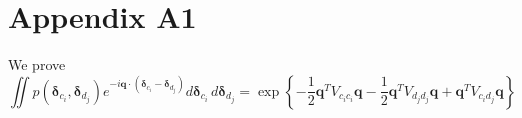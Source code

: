 \documentclass{article}
\begin{document}
\section{Appendix A1}
We prove
\begin{equation}
\iint p( \boldsymbol{\delta}_{c_i},  \boldsymbol{\delta}_{d_j} )
e^{-i \mathbf{q} \cdot ( \boldsymbol{\delta}_{c_i}  - \boldsymbol{\delta}_{d_j})} 
d \boldsymbol{\delta}_{c_i}  \, d \boldsymbol{\delta}_{d_j}
=
\exp \left\{
- \frac{1}{2} \mathbf{q}^T V_{c_i c_i} \mathbf{q}
- \frac{1}{2} \mathbf{q}^T V_{d_j d_j} \mathbf{q}
+ \mathbf{q}^T V_{c_i d_j} \mathbf{q}
\right\}
\label{eq:disorder_term}
\end{equation}






\end{document}
